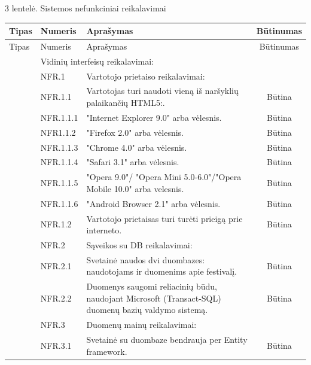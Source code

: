 \documentclass{VUMIFPSkursinis}
\begin{document}
\centerline{3 lentelė. Sistemos nefunkciniai reikalavimai} 
\setlength\tabcolsep{4pt}
\begin{longtable}{|p{1cm}|p{3cm}|p{9cm}|c|}
\hline
Tipas & Numeris & Aprašymas & Būtinumas \\ \hline
\endfirsthead
\hline
Tipas & Numeris & Aprašymas & Būtinumas \\ \hline
\endhead
\hline
\endfoot
\hline
\multirow{43}{*}{\rotatebox{90} {~~~~~~~~~~~~~~~~~~~~~~~~~~~~~~~~~~~~~~~~~~~~~~~~~~~~~~~~~~~~~~~~~~~~~~~~~~~~~~~~~~~~~~~~~~~~~~~~~~~~~~~~~~~~~~~~~~~~~~~~~Nefunkciniai reikalavimai}} & \multicolumn{3}{l|}{ \cellcolor{light-gray}Vidinių interfeisų reikalavimai:} \\ \cline{2-4} 
 & \cellcolor{light-gray} NFR.1 & \multicolumn{2}{l|}{ \cellcolor{light-gray}Vartotojo prietaiso reikalavimai:} \\ \cline{2-4} 
 & NFR.1.1 & Vartotojas turi naudoti vieną iš naršyklių palaikančių HTML5:. & Būtina \\ \cline{2-4} 
 & NFR.1.1.1 & "Internet Explorer 9.0" arba vėlesnis. & Būtina \\ \cline{2-4} 
 & NFR1.1.2 & "Firefox 2.0" arba vėlesnis. & Būtina \\ \cline{2-4} 
 & NFR.1.1.3 & "Chrome 4.0" arba vėlesnis. & Būtina \\ \cline{2-4} 
 & NFR.1.1.4 & "Safari 3.1" arba vėlesnis. & Būtina \\ \cline{2-4} 
 & NFR.1.1.5 & "Opera 9.0"/ "Opera Mini 5.0-6.0"/"Opera Mobile 10.0" arba velesnis. & Būtina \\ \cline{2-4} 
 & NFR.1.1.6 & "Android Browser 2.1" arba vėlesnis. & Būtina \\ \cline{2-4} 
 & NFR.1.2 & Vartotojo prietaisas turi turėti prieigą prie interneto. & Būtina \\ \cline{2-4} 
 &  \cellcolor{light-gray}NFR.2 & \multicolumn{2}{l|}{ \cellcolor{light-gray}Sąveikos su DB reikalavimai:} \\ \cline{2-4} 
 & NFR.2.1 & Svetainė naudos dvi duombazes: naudotojams ir duomenims apie festivalį. & Būtina \\ \cline{2-4} 
 & NFR.2.2 & Duomenys saugomi reliacinių būdu, naudojant Microsoft (Transact-SQL) duomenų bazių valdymo sistemą. & Būtina \\ \cline{2-4} 
 & \cellcolor{light-gray} NFR.3 & \multicolumn{2}{l|}{ \cellcolor{light-gray}Duomenų mainų reikalavimai:} \\ \cline{2-4} 
 & NFR.3.1 & Svetainė su duombaze bendrauja per Entity framework. & Būtina \\ \cline{2-4} 

\end{longtable}
\end{document}
